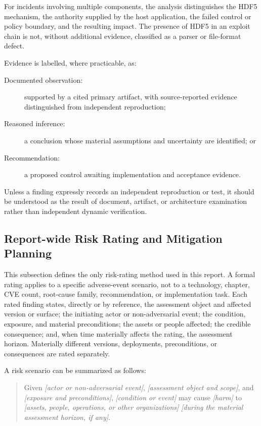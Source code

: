 \documentclass[../main.tex]{subfiles}
\begin{document}
For incidents involving multiple components, the analysis distinguishes the
HDF5 mechanism, the authority supplied by the host application, the failed
control or policy boundary, and the resulting impact. The presence of HDF5 in
an exploit chain is not, without additional evidence, classified as a parser or
file-format defect.

Evidence is labelled, where practicable, as:

\begin{description}
    \item[Documented observation:] supported by a cited primary artifact, with
          source-reported evidence distinguished from independent reproduction;
    \item[Reasoned inference:] a conclusion whose material assumptions and
          uncertainty are identified; or
    \item[Recommendation:] a proposed control awaiting implementation and
          acceptance evidence.
\end{description}

Unless a finding expressly records an independent reproduction or test, it
should be understood as the result of document, artifact, or architecture
examination rather than independent dynamic verification.

\subsection{Report-wide Risk Rating and Mitigation Planning}
\label{sec:risk-rubric}

This subsection defines the only risk-rating method used in this report. A
formal rating applies to a specific adverse-event scenario, not to a technology,
chapter, CVE count, root-cause family, recommendation, or implementation task.
Each rated finding states, directly or by reference, the assessment object and
affected version or surface; the initiating actor or non-adversarial event; the
condition, exposure, and material preconditions; the assets or people affected;
the credible consequence; and, when time materially affects the rating, the
assessment horizon. Materially different versions, deployments, preconditions,
or consequences are rated separately.

A risk scenario can be summarized as follows:

\begin{quote}
Given \emph{[actor or non-adversarial event]}, \emph{[assessment object and
scope]}, and \emph{[exposure and preconditions]}, \emph{[condition or event]}
may cause \emph{[harm]} to \emph{[assets, people, operations, or other
organizations]} \emph{[during the material assessment horizon, if any]}.
\end{quote}
\end{document}

